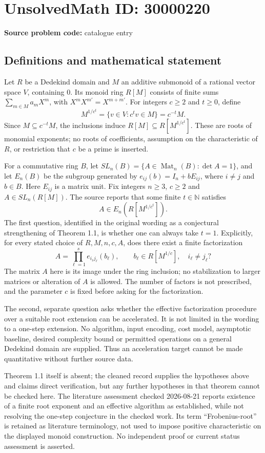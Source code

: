 \documentclass[11pt]{article}
\newcommand{\N}{\mathbb{N}}
\begin{document}
\section*{UnsolvedMath ID: 30000220}
\textbf{Source problem code:} catalogue entry
\subsection{Definitions and mathematical statement}
Let \(R\) be a Dedekind domain and \(M\) an additive submonoid of a rational vector space \(V\), containing \(0\). Its monoid ring \(R[M]\) consists of finite sums \(\sum_{m\in M}a_mX^m\), with \(X^mX^{m'}=X^{m+m'}\). For integers \(c\geq2\) and \(t\geq0\), define
\[
 M^{1/c^t}=\{v\in V:c^tv\in M\}=c^{-t}M.
\]
Since \(M\subseteq c^{-t}M\), the inclusions induce \(R[M]\subseteq R[M^{1/c^t}]\). These are roots of monomial exponents; no roots of coefficients, assumption on the characteristic of \(R\), or restriction that \(c\) be a prime is inserted.

For a commutative ring \(B\), let \(SL_n(B)=\{A\in\operatorname{Mat}_n(B):\det A=1\}\), and let \(E_n(B)\) be the subgroup generated by \(e_{ij}(b)=I_n+bE_{ij}\), where \(i\ne j\) and \(b\in B\). Here \(E_{ij}\) is a matrix unit. Fix integers \(n\geq3\), \(c\geq2\) and \(A\in SL_n(R[M])\). The source reports that some finite \(t\in\N\) satisfies
\[
 A\in E_n(R[M^{1/c^t}]).
\]
The first question, identified in the original wording as a conjectural strengthening of Theorem 1.1, is whether one can always take \(t=1\). Explicitly, for every stated choice of \(R,M,n,c,A\), does there exist a finite factorization
\[
 A=\prod_{\ell=1}^{s}e_{i_\ell j_\ell}(b_\ell),
 \qquad b_\ell\in R[M^{1/c}],\quad i_\ell\ne j_\ell?
\]
The matrix \(A\) here is its image under the ring inclusion; no stabilization to larger matrices or alteration of \(A\) is allowed. The number of factors is not prescribed, and the parameter \(c\) is fixed before asking for the factorization.

The second, separate question asks whether the effective factorization procedure over a suitable root extension can be accelerated. It is not limited in the wording to a one-step extension. No algorithm, input encoding, cost model, asymptotic baseline, desired complexity bound or permitted operations on a general Dedekind domain are supplied. Thus an acceleration target cannot be made quantitative without further source data.

Theorem 1.1 itself is absent; the cleaned record supplies the hypotheses above and claims direct verification, but any further hypotheses in that theorem cannot be checked here. The literature assessment checked 2026-08-21 reports existence of a finite root exponent and an effective algorithm as established, while not resolving the one-step conjecture in the checked work. Its term ``Frobenius-root'' is retained as literature terminology, not used to impose positive characteristic on the displayed monoid construction. No independent proof or current status assessment is asserted.
\end{document}

